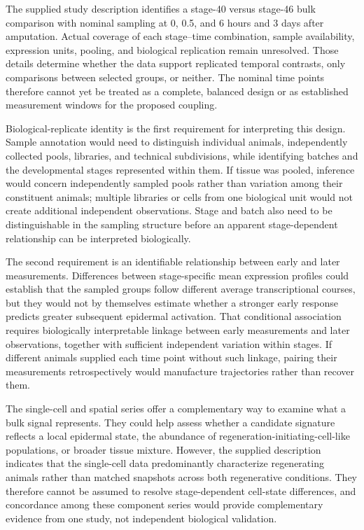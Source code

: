 \documentclass[11pt]{article}
\begin{document}
The supplied study description identifies a stage-40 versus stage-46 bulk comparison with nominal sampling at 0, 0.5, and 6 hours and 3 days after amputation. Actual coverage of each stage–time combination, sample availability, expression units, pooling, and biological replication remain unresolved. Those details determine whether the data support replicated temporal contrasts, only comparisons between selected groups, or neither. The nominal time points therefore cannot yet be treated as a complete, balanced design or as established measurement windows for the proposed coupling.

Biological-replicate identity is the first requirement for interpreting this design. Sample annotation would need to distinguish individual animals, independently collected pools, libraries, and technical subdivisions, while identifying batches and the developmental stages represented within them. If tissue was pooled, inference would concern independently sampled pools rather than variation among their constituent animals; multiple libraries or cells from one biological unit would not create additional independent observations. Stage and batch also need to be distinguishable in the sampling structure before an apparent stage-dependent relationship can be interpreted biologically.

The second requirement is an identifiable relationship between early and later measurements. Differences between stage-specific mean expression profiles could establish that the sampled groups follow different average transcriptional courses, but they would not by themselves estimate whether a stronger early response predicts greater subsequent epidermal activation. That conditional association requires biologically interpretable linkage between early measurements and later observations, together with sufficient independent variation within stages. If different animals supplied each time point without such linkage, pairing their measurements retrospectively would manufacture trajectories rather than recover them.

The single-cell and spatial series offer a complementary way to examine what a bulk signal represents. They could help assess whether a candidate signature reflects a local epidermal state, the abundance of regeneration-initiating-cell-like populations, or broader tissue mixture. However, the supplied description indicates that the single-cell data predominantly characterize regenerating animals rather than matched snapshots across both regenerative conditions. They therefore cannot be assumed to resolve stage-dependent cell-state differences, and concordance among these component series would provide complementary evidence from one study, not independent biological validation.
\end{document}
